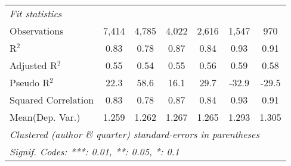 \begin{tabular}{lcccccc}
   \midrule
   \emph{Fit statistics}\\
   Observations                                               & 7,414       & 4,785         & 4,022         & 2,616        & 1,547         & 970\\  
   R$^2$                                                      & 0.83        & 0.78          & 0.87          & 0.84         & 0.93          & 0.91\\  
   Adjusted R$^2$                                             & 0.55        & 0.54          & 0.55          & 0.56         & 0.59          & 0.58\\  
   Pseudo R$^2$                                               & 22.3        & 58.6          & 16.1          & 29.7         & -32.9         & -29.5\\  
   Squared Correlation                                        & 0.83        & 0.78          & 0.87          & 0.84         & 0.93          & 0.91\\  
Mean(Dep. Var.) & 1.259 & 1.262 & 1.267 & 1.265 & 1.293 & 1.305 \\
   \midrule \midrule
   \multicolumn{7}{l}{\emph{Clustered (author \& quarter) standard-errors in parentheses}}\\
   \multicolumn{7}{l}{\emph{Signif. Codes: ***: 0.01, **: 0.05, *: 0.1}}\\
\end{tabular}
\par\endgroup

